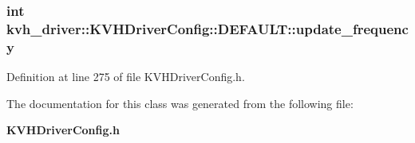 \subsubsection[{update\-\_\-frequency}]{\setlength{\rightskip}{0pt plus 5cm}int {\bf kvh\-\_\-driver\-::\-K\-V\-H\-Driver\-Config\-::\-D\-E\-F\-A\-U\-L\-T\-::update\-\_\-frequency}}\label{classkvh__driver_1_1KVHDriverConfig_1_1DEFAULT_a0649e12b27fac120e7487bd73af86096}


\-Definition at line 275 of file \-K\-V\-H\-Driver\-Config.\-h.



\-The documentation for this class was generated from the following file\-:\begin{DoxyCompactItemize}
\item 
{\bf \-K\-V\-H\-Driver\-Config.\-h}\end{DoxyCompactItemize}
